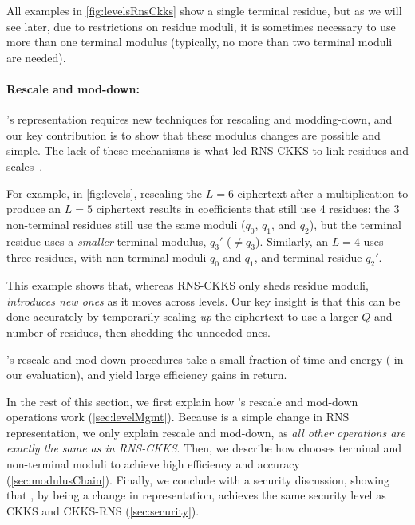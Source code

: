 All examples in \autoref{fig:levelsRnsCkks} show a single terminal residue, 
but as we will see later, due to restrictions on residue moduli, it
is sometimes necessary to use more than one terminal modulus (typically, no
more than two terminal moduli are needed).


\paragraph{Rescale and mod-down:}
\name's representation requires new techniques for rescaling and modding-down,
and our key contribution is to show that these modulus changes are possible and
simple.
The lack of these mechanisms is what led RNS-CKKS to link residues and
scales~\cite{cheon2019full}.

For example, in \autoref{fig:levels}, rescaling the $L=6$ ciphertext after a
multiplication to produce an $L=5$ ciphertext results in coefficients that
still use 4 residues: the 3 non-terminal residues still use the same moduli
($q_0$, $q_1$, and $q_2$), but the terminal residue uses a \emph{smaller}
terminal modulus, $q_3'$ ($\neq q_3$).
Similarly, an $L=4$ uses three residues, with non-terminal moduli $q_0$ and
$q_1$, and terminal residue $q_2'$.

This example shows that, whereas RNS-CKKS only sheds residue moduli, \name
\emph{introduces new ones} as it moves across levels.
Our key insight is that this can be done accurately by temporarily scaling
\emph{up} the ciphertext to use a larger $Q$ and number of residues, then
shedding the unneeded ones.

\name's rescale and mod-down procedures
take a small fraction of time and energy ( in our evaluation),
and yield large efficiency gains in return.

\smallskip

In the rest of this section, we first explain how \name's rescale and mod-down
operations work (\autoref{sec:levelMgmt}).
Because \name is a simple change in RNS representation, we only explain rescale
and mod-down, as \emph{all other operations are exactly the same as in
RNS-CKKS}.
Then, we describe how \name chooses terminal and non-terminal moduli to achieve
high efficiency and accuracy (\autoref{sec:modulusChain}).
Finally, we conclude with a security discussion, showing that \name, by being a
change in representation, achieves the same security level as CKKS and CKKS-RNS
(\autoref{sec:security}).

